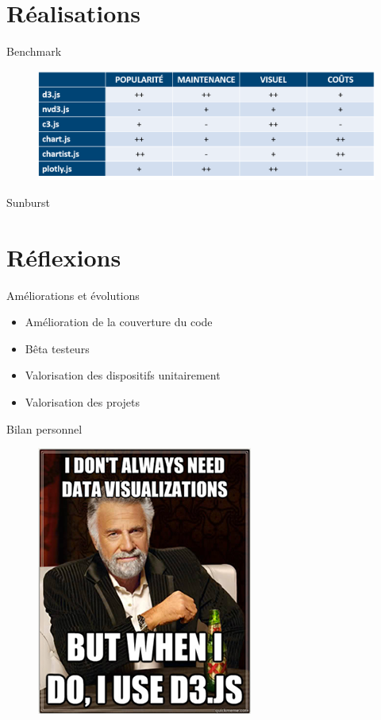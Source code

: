 \documentclass[10pt]{beamer}
\begin{document}
	\section{Réalisations}
		\begin{frame}{Benchmark}
			\begin{figure}
			\includegraphics[width=\linewidth]{resources/bench.png}
			\end{figure}
		\end{frame}
		\begin{frame}{Sunburst}
		\end{frame}
	\section{Réflexions}
	\begin{frame}{Améliorations et évolutions}
	\begin{itemize}[<+- | alert@+>]
	\item Amélioration de la couverture du code
	\item Bêta testeurs
	\item Valorisation des dispositifs unitairement
	\item Valorisation des projets
	\end{itemize}
	\end{frame}
	\begin{frame}{Bilan personnel}
	\begin{center}
	\begin{figure}
	\includegraphics[scale=2]{resources/dataviz.png}	
	\end{figure}
	\end{center}
 	\end{frame}
\end{document}
